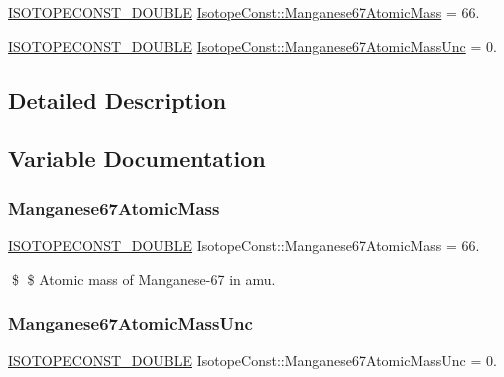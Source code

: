 \begin{DoxyCompactItemize}
\item 
\mbox{\hyperlink{group___isotope_const-_macros_ga8f45a7272ce02c0b4c65c44636ed719a}{I\+S\+O\+T\+O\+P\+E\+C\+O\+N\+S\+T\+\_\+\+D\+O\+U\+B\+LE}} \mbox{\hyperlink{group___isotope_const-_manganese-_mn67_ga1a44dc262fb99d74d62960faec587631}{Isotope\+Const\+::\+Manganese67\+Atomic\+Mass}} = 66.
\item 
\mbox{\hyperlink{group___isotope_const-_macros_ga8f45a7272ce02c0b4c65c44636ed719a}{I\+S\+O\+T\+O\+P\+E\+C\+O\+N\+S\+T\+\_\+\+D\+O\+U\+B\+LE}} \mbox{\hyperlink{group___isotope_const-_manganese-_mn67_ga15308551bff3a074e14cb51a3c5bacf7}{Isotope\+Const\+::\+Manganese67\+Atomic\+Mass\+Unc}} = 0.
\end{DoxyCompactItemize}


\subsection{Detailed Description}


\subsection{Variable Documentation}
\mbox{\label{group___isotope_const-_manganese-_mn67_ga1a44dc262fb99d74d62960faec587631}} 
\subsubsection{\texorpdfstring{Manganese67\+Atomic\+Mass}{Manganese67AtomicMass}}
{\footnotesize\ttfamily \mbox{\hyperlink{group___isotope_const-_macros_ga8f45a7272ce02c0b4c65c44636ed719a}{I\+S\+O\+T\+O\+P\+E\+C\+O\+N\+S\+T\+\_\+\+D\+O\+U\+B\+LE}} Isotope\+Const\+::\+Manganese67\+Atomic\+Mass = 66.}

\$ \$ Atomic mass of Manganese-\/67 in amu. \mbox{\label{group___isotope_const-_manganese-_mn67_ga15308551bff3a074e14cb51a3c5bacf7}} 
\subsubsection{\texorpdfstring{Manganese67\+Atomic\+Mass\+Unc}{Manganese67AtomicMassUnc}}
{\footnotesize\ttfamily \mbox{\hyperlink{group___isotope_const-_macros_ga8f45a7272ce02c0b4c65c44636ed719a}{I\+S\+O\+T\+O\+P\+E\+C\+O\+N\+S\+T\+\_\+\+D\+O\+U\+B\+LE}} Isotope\+Const\+::\+Manganese67\+Atomic\+Mass\+Unc = 0.}

